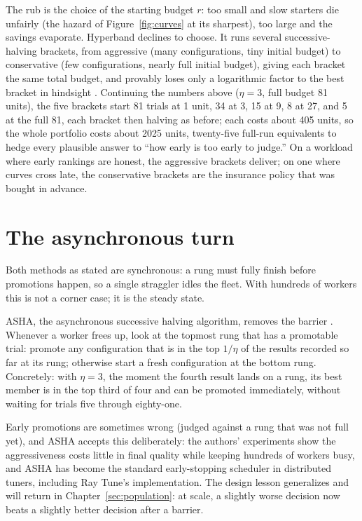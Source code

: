 The rub is the choice of the starting budget $r$: too small and slow
starters die unfairly (the hazard of Figure~\ref{fig:curves} at its
sharpest), too large and the savings evaporate. Hyperband declines to
choose. It runs several successive-halving brackets, from aggressive
(many configurations, tiny initial budget) to conservative (few
configurations, nearly full initial budget), giving each bracket the
same total budget, and provably loses only a logarithmic factor to the
best bracket in hindsight \citep{li2018hyperband}. Continuing the
numbers above ($\eta = 3$, full budget 81 units), the five brackets
start 81 trials at 1 unit, 34 at 3, 15 at 9, 8 at 27, and 5 at the full
81, each bracket then halving as before; each costs about 405 units, so
the whole portfolio costs about 2025 units, twenty-five full-run
equivalents to hedge every plausible answer to ``how early is too early
to judge.'' On a workload where early rankings are honest, the
aggressive brackets deliver; on one where curves cross late, the
conservative brackets are the insurance policy that was bought in
advance.

\section{The asynchronous turn}

Both methods as stated are synchronous: a rung must fully finish before
promotions happen, so a single straggler idles the fleet. With hundreds
of workers this is not a corner case; it is the steady state.

ASHA,
the asynchronous successive halving algorithm,
removes the barrier \citep{li2020asha}. Whenever a worker frees up, look
at the topmost rung that has a promotable trial: promote any
configuration that is in the top $1/\eta$ of the results recorded so far
at its rung; otherwise start a fresh configuration at the bottom rung.
Concretely: with $\eta = 3$, the moment the fourth result lands on a
rung, its best member is in the top third of four and can be promoted
immediately, without waiting for trials five through eighty-one.

Early
promotions are sometimes wrong (judged against a rung that was not full
yet), and ASHA accepts this deliberately: the authors' experiments show
the aggressiveness costs little in final quality while keeping hundreds
of workers busy, and ASHA has become the standard early-stopping
scheduler in distributed tuners, including Ray Tune's implementation.
The design lesson generalizes and will return in
Chapter~\ref{sec:population}: at scale, a slightly worse decision now
beats a slightly better decision after a barrier.

